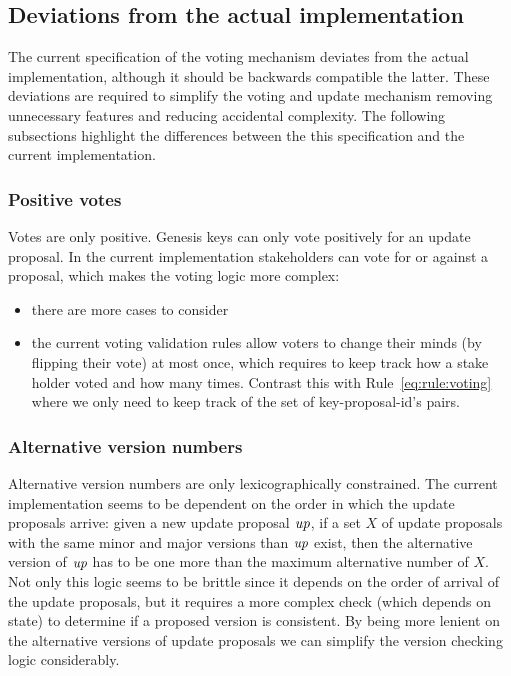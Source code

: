\clearpage

\subsection{Deviations from the actual implementation}
\label{sec:deviation-actual-impl}

The current specification of the voting mechanism deviates from the actual
implementation, although it should be backwards compatible the latter. These
deviations are required to simplify the voting and update mechanism removing
unnecessary features and reducing accidental complexity. The following
subsections highlight the differences between the this specification and the
current implementation.

\subsubsection{Positive votes}
\label{sec:only-positive-votes}

Votes are only positive. Genesis keys can only vote positively for an update
proposal. In the current implementation stakeholders can vote for or against a
proposal, which makes the voting logic more complex:
\begin{itemize}
\item there are more cases to consider
\item the current voting validation rules allow voters to change their minds
  (by flipping their vote) at most once, which requires to keep track how a
  stake holder voted and how many times. Contrast this with
  Rule~\ref{eq:rule:voting} where we only need to keep track of the set of
  key-proposal-id's pairs.
\end{itemize}

\subsubsection{Alternative version numbers}
\label{sec:alt-version-numbers-constraints}

Alternative version numbers are only lexicographically constrained. The current
implementation seems to be dependent on the order in which the update proposals
arrive: given a new update proposal $\mathit{up}$, if a set $X$ of update
proposals with the same minor and major versions than $\mathit{up}$ exist, then
the alternative version of $\mathit{up}$ has to be one more than the maximum
alternative number of $X$. Not only this logic seems to be brittle since it
depends on the order of arrival of the update proposals, but it requires a more
complex check (which depends on state) to determine if a proposed version is
consistent. By being more lenient on the alternative versions of update
proposals we can simplify the version checking logic considerably.

